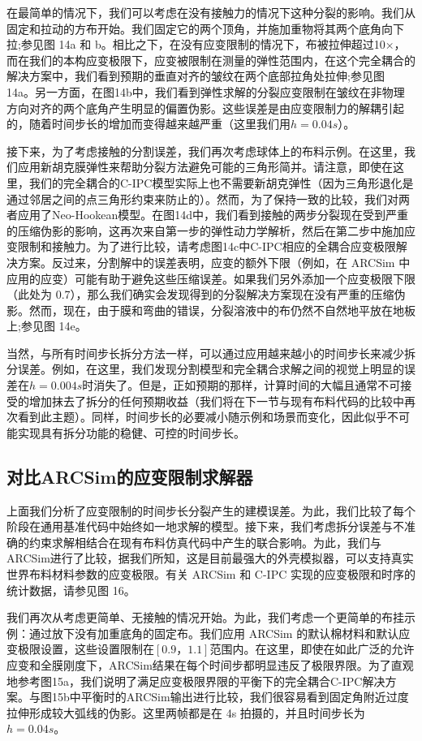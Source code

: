 在最简单的情况下，我们可以考虑在没有接触力的情况下这种分裂的影响。我们从固定和拉动的方布开始。我们固定它的两个顶角，并施加重物将其两个底角向下拉;参见图 14a 和 b。相比之下，在没有应变限制的情况下，布被拉伸超过10×，而在我们的本构应变极限下，应变被限制在测量的弹性范围内，在这个完全耦合的解决方案中，我们看到预期的垂直对齐的皱纹在两个底部拉角处拉伸;参见图 14a。另一方面，在图14b中，我们看到弹性求解的分裂应变限制在皱纹在非物理方向对齐的两个底角产生明显的偏置伪影。这些误差是由应变限制力的解耦引起的，随着时间步长的增加而变得越来越严重（这里我们用$h = 0.04s$）。

接下来，为了考虑接触的分割误差，我们再次考虑球体上的布料示例。在这里，我们应用新胡克膜弹性来帮助分裂方法避免可能的三角形简并。请注意，即使在这里，我们的完全耦合的C-IPC模型实际上也不需要新胡克弹性（因为三角形退化是通过邻居之间的点三角形约束来防止的）。然而，为了保持一致的比较，我们对两者应用了Neo-Hookean模型。在图14d中，我们看到接触的两步分裂现在受到严重的压缩伪影的影响，这再次来自第一步的弹性动力学解析，然后在第二步中施加应变限制和接触力。为了进行比较，请考虑图14c中C-IPC相应的全耦合应变极限解决方案。反过来，分割解中的误差表明，应变的额外下限（例如，在 ARCSim 中应用的应变）可能有助于避免这些压缩误差。如果我们另外添加一个应变极限下限（此处为 0.7），那么我们确实会发现得到的分裂解决方案现在没有严重的压缩伪影。然而，现在，由于膜和弯曲的错误，分裂溶液中的布仍然不自然地平放在地板上;参见图 14e。

当然，与所有时间步长拆分方法一样，可以通过应用越来越小的时间步长来减少拆分误差。例如，在这里，我们发现分割模型和完全耦合求解之间的视觉上明显的误差在$h = 0.004s$时消失了。但是，正如预期的那样，计算时间的大幅且通常不可接受的增加抹去了拆分的任何预期收益（我们将在下一节与现有布料代码的比较中再次看到此主题）。同样，时间步长的必要减小随示例和场景而变化，因此似乎不可能实现具有拆分功能的稳健、可控的时间步长。

\subsection{对比ARCSim的应变限制求解器}

上面我们分析了应变限制的时间步长分裂产生的建模误差。为此，我们比较了每个阶段在通用基准代码中始终如一地求解的模型。接下来，我们考虑拆分误差与不准确的约束求解相结合在现有布料仿真代码中产生的联合影响。为此，我们与ARCSim进行了比较，据我们所知，这是目前最强大的外壳模拟器，可以支持真实世界布料材料参数的应变极限。有关 ARCSim 和 C-IPC 实现的应变极限和时序的统计数据，请参见图 16。

我们再次从考虑更简单、无接触的情况开始。为此，我们考虑一个更简单的布挂示例：通过放下没有加重底角的固定布。我们应用 ARCSim 的默认棉材料和默认应变极限设置，这些设置限制在$ [0.9， 1.1] $范围内。在这里，即使在如此广泛的允许应变和全膜刚度下，ARCSim结果在每个时间步都明显违反了极限界限。为了直观地参考图15a，我们说明了满足应变极限界限的平衡下的完全耦合C-IPC解决方案。与图15b中平衡时的ARCSim输出进行比较，我们很容易看到固定角附近过度拉伸形成较大弧线的伪影。这里两帧都是在 4s 拍摄的，并且时间步长为 $h = 0.04s$。

